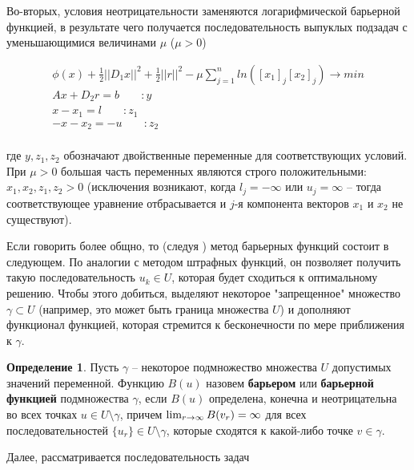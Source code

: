 \documentclass[a4paper, 12pt, titlepage]{article}
\theoremstyle{definition}
\newtheorem{SmartDefinition}{Определение}
\theoremstyle{plain}
\theoremstyle{plain}
\begin{document}
Во-вторых, условия неотрицательности заменяются логарифмической барьерной
функцией, в результате чего получается последовательность выпуклых подзадач с
уменьшающимися величинами $\mu$ ($\mu > 0$)

\begin{equation}
 \label{eq:co-mu}
 \begin{aligned}
  \phi(x) + \frac{1}{2}||D_{1} x||^{2} + \frac{1}{2}||r||^{2} -
  \mu \sum \limits_{j = 1}^{n} ln([x_{1}]_{j} [x_{2}]_{j}) \to min \\
  A x + D_{2} r = b \;\;\;\;\;\;\; : y\\
  x - x_{1} = l \;\;\;\;\;\;\; : z_{1}\\
  -x - x_{2} = -u \;\;\;\;\;\;\; : z_{2}\\
 \end{aligned}
\end{equation}

где $y, z_{1}, z_{2}$ обозначают двойственные переменные для соответствующих
условий. При $\mu > 0$ большая часть переменных являются строго положительными:
$x_{1}, x_{2}, z_{1}, z_{2} > 0$ (исключения возникают, когда $l_{j} = -\infty$
или $u_{j} = \infty$ -- тогда соответствующее уравнение отбрасывается и
$j$-я компонента векторов $x_{1}$ и $x_{2}$ не существуют).

Если говорить более общно, то (следуя \cite{Vasilev1980}) метод барьерных
функций состоит в следующем. По аналогии с методом штрафных функций, он
позволяет получить такую последовательность $u_{k} \in U$, которая будет
сходиться к оптимальному решению. Чтобы этого добиться, выделяют некоторое
"запрещенное" множество $\gamma \subset U$ (например, это может быть граница
множества $U$) и дополняют функционал функцией, которая стремится к
бесконечности по мере приближения к $\gamma$.

\begin{SmartDefinition}
 Пусть $\gamma$ -- некоторое подмножество множества $U$ допустимых значений
 переменной. Функцию $B(u)$ назовем \textbf{барьером} или \textbf{барьерной
 функцией} подмножества $\gamma$, если $B(u)$ определена, конечна и 
 неотрицательна во всех точках $u \in U \setminus \gamma$, причем
 $\operatornamewithlimits{lim}_{r \to \infty} B(v_{r}) = \infty$ для всех
 последовательностей $\{u_{r}\} \in U \setminus \gamma$, которые сходятся к
 какой-либо точке $v \in \gamma$.
\end{SmartDefinition}

Далее, рассматривается последовательность задач
\end{document}
